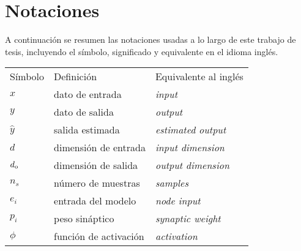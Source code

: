 \chapter{Notaciones}

A continuación se resumen las notaciones usadas a lo largo de este trabajo de tesis, incluyendo el símbolo,  significado y equivalente en el idioma inglés.


\begin{tabular} {l l l}
    Símbolo & Definición & Equivalente al inglés \\
    $x$ & dato de entrada & \emph{input} \\
    $y$ & dato de salida & \emph{output} \\
    $\hat{y}$ & salida estimada & \emph{estimated output} \\
    $d$ & dimensión de entrada & \emph{input dimension} \\
    $d_{\rm o}$ & dimensión de salida & \emph{output dimension} \\
    $n_s$ & número de muestras & \emph{samples} \\
    $e_i$ & entrada del modelo & \emph{node input} \\
    $p_i$ & peso sináptico & \emph{synaptic weight} \\
    $\phi$ & función de activación & \emph{activation} \\
\end{tabular}


